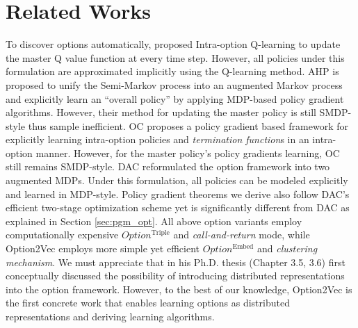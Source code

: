 \documentclass{article}
\begin{document}
\vspace{-2mm}\section{Related Works}
\label{sec:review}
\vspace{-2mm}To discover options automatically, 
proposed Intra-option Q-learning to update the master Q value
function at every time step. However, all policies under this
formulation are approximated implicitly using the Q-learning
method. AHP \cite{levy2011unified} is proposed to unify the
Semi-Markov process into an augmented Markov process and
explicitly learn an ``overall policy'' by applying MDP-based
policy gradient algorithms. However, their method for updating
the master policy is still SMDP-style thus sample inefficient. OC
\cite{bacon2017option} proposes a policy gradient based framework
for explicitly learning intra-option policies and
\emph{termination function}s in an intra-option manner. However,
for the master policy's policy gradients learning, OC still
remains SMDP-style. DAC \cite{zhang2019dac} reformulated the
option framework into two augmented MDPs. Under this formulation, all policies can be modeled explicitly and learned in MDP-style. Policy gradient theorems we derive also follow DAC's efficient
two-stage optimization scheme yet is significantly different
from DAC as explained in Section \ref{sec:pgm_opt}. All above
option variants employ computationally expensive
$Option^{\textrm{Triple}}$ and \emph{call-and-return} mode, while
Option2Vec employs more simple yet efficient
$Option^{\textrm{Embed}}$ and \emph{clustering mechanism}. We
must appreciate that  in his Ph.D.
thesis (Chapter 3.5, 3.6) first conceptually discussed the
possibility of introducing distributed representations into the
option framework. However, to the best of our knowledge,
Option2Vec is the first concrete work that enables learning
options as distributed representations and deriving learning
algorithms.

\end{document}
